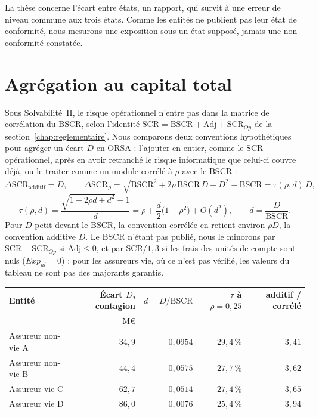 La thèse concerne l'écart entre états, un rapport, qui survit à une erreur de niveau commune aux
trois états. Comme les entités ne publient pas leur état de conformité, nous mesurons une exposition
sous un état supposé, jamais une non-conformité constatée.

\section{Agrégation au capital total}
\label{sec:agregation-scr}

Sous Solvabilité~II, le risque opérationnel n'entre pas dans la matrice de corrélation du BSCR,
selon l'identité $\mathrm{SCR} = \mathrm{BSCR} + \mathrm{Adj} + \mathrm{SCR}_{Op}$ de la
section~\ref{chap:reglementaire}. Nous comparons deux conventions hypothétiques pour agréger un écart $D$ en ORSA : l'ajouter en entier, comme le SCR opérationnel, après en avoir retranché le risque informatique que celui-ci couvre déjà, ou le traiter comme un module corrélé à $\rho$ avec le BSCR :
\begin{equation}\label{eq:agregation}
\Delta\mathrm{SCR}_{\text{additif}} = D,\qquad
\Delta\mathrm{SCR}_{\rho}=\sqrt{\mathrm{BSCR}^2+2\rho\,\mathrm{BSCR}\,D+D^2}-\mathrm{BSCR}
=\tau(\rho,d)\,D,
\end{equation}
\begin{equation}\label{eq:tau}
\tau(\rho,d)=\frac{\sqrt{1+2\rho d+d^2}-1}{d}
=\rho+\frac{d}{2}\bigl(1-\rho^2\bigr)+O(d^2),\qquad d=\frac{D}{\mathrm{BSCR}} .
\end{equation}
Pour $D$ petit devant le BSCR, la convention corrélée en retient environ $\rho D$, la convention additive $D$. Le BSCR n'étant pas publié, nous le minorons par $\mathrm{SCR}-\mathrm{SCR}_{Op}$ si $\mathrm{Adj}\le0$, et par $\mathrm{SCR}/1{,}3$ si les frais des unités de compte sont nuls ($Exp_{ul}=0$) ; pour les assureurs vie, où ce n'est pas vérifié, les valeurs du tableau ne sont pas des majorants garantis.

\begin{center}\small
\renewcommand{\arraystretch}{1.25}
\begin{tabular}{@{}l r r r r@{}}
\toprule
\textbf{Entité} & \textbf{Écart $D$, contagion} & \textbf{$d = D/\mathrm{BSCR}$} &
\textbf{$\tau$ à $\rho = 0{,}25$} & \textbf{additif / corrélé} \\
 & M\euro & & & \\
\midrule
Assureur non-vie A & $34{,}9$ & $0{,}0954$ & $29{,}4\,\%$ & $3{,}41$ \\
Assureur non-vie B & $44{,}4$ & $0{,}0575$ & $27{,}7\,\%$ & $3{,}62$ \\
Assureur vie C & $62{,}7$ & $0{,}0514$ & $27{,}4\,\%$ & $3{,}65$ \\
Assureur vie D & $86{,}0$ & $0{,}0076$ & $25{,}4\,\%$ & $3{,}94$ \\
\bottomrule
\end{tabular}
\end{center}

